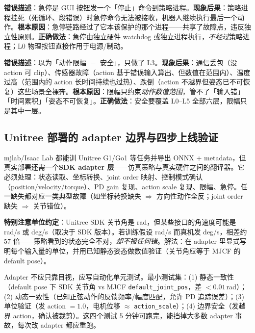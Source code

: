 \begin{pitfall}[急停只挂在 UI 层]
\textbf{错误描述}：急停是 GUI 按钮发一个「停止」命令到策略进程。\textbf{现象后果}：策略进程挂死（死循环、段错误）时急停命令无法被接收，机器人继续执行最后一个动作。\textbf{根本原因}：急停链路经过了它本该保护的那个进程——共享了故障点，违反独立性原则。\textbf{正确做法}：急停由独立硬件 watchdog 或独立进程执行，\emph{不经过}策略进程；L0 物理按钮直接作用于电源/制动。
\end{pitfall}

\begin{pitfall}
\textbf{错误描述}：以为「动作限幅 $=$ 安全」，只做了 L3。\textbf{现象后果}：通信丢包（没 action 可 clip）、传感器故障（action 基于错误输入算出、但数值在范围内）、温度过高（范围内的 action 长时间持续也过热）、跌倒（action 不越界但姿态已不可恢复）这些场景全裸奔。\textbf{根本原因}：限幅只约束\emph{动作数值范围}，管不了「输入错」「时间累积」「姿态不可恢复」。\textbf{正确做法}：安全要覆盖 L0--L5 全部六层，限幅只是其中一层。
\end{pitfall}

\subsection{Unitree 部署的 adapter 边界与四步上线验证}
\label{sec:rlmc-s2r-adapter}

mjlab/Isaac Lab 都能训 Unitree G1/Go1 等任务并导出 ONNX $+$ metadata，但真实部署还需一个\textbf{SDK adapter 层}——仿真策略与真实硬件之间的翻译器。它必须处理：状态读取、坐标转换、joint order 映射、控制模式确认（position/velocity/torque）、PD gain 复现、action scale 复现、限幅、急停。任一缺失都对应一类典型故障（如坐标转换缺失 $\Rightarrow$ 方向性动作全反；joint order 缺失 $\Rightarrow$ 关节错位）。

\textbf{特别注意单位约定}：Unitree SDK 关节角是 rad，但某些接口的角速度可能是 rad/s 或 deg/s（取决于 SDK 版本）。若训练假设 rad/s 而真机发 deg/s，相差约 57 倍——策略看到的状态完全不对，\emph{却不报任何错}。解法：在 adapter 里显式写明每个输入量的单位，并用已知静态姿态做数值验证（关节角应等于 MJCF 的 default pose）。

Adapter 不应只靠目视，应写自动化单元测试。最小测试集：(1) 静态一致性（default pose 下 SDK 关节角 vs MJCF \verb|default_joint_pos|，差 $<0.01$\,rad）；(2) 动态一致性（已知正弦动作的反馈频率/幅度匹配，允许 PD 追踪误差）；(3) 单位验证（发 action $=1.0$，电机位移 $\approx$ \verb|action_scale|）；(4) 边界安全（发越界 action，确认被裁剪）。这四个测试 5 分钟可跑完，能挡掉大多数 adapter 事故，每次改 adapter 都应重跑。

